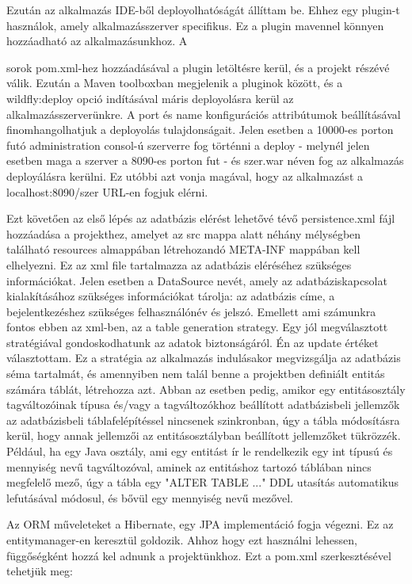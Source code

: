 \documentclass[centeredchapter]{thesis-ekf}
\theoremstyle{definition}
\theoremstyle{remark}
\begin{document}
Ezután az alkalmazás IDE-ből deployolhatóságát állíttam be. Ehhez egy plugin-t használok, amely alkalmazásszerver specifikus. Ez a plugin mavennel könnyen hozzáadható az alkalmazásunkhoz. A 	

sorok pom.xml-hez hozzáadásával a plugin letöltésre kerül, és a projekt részévé válik. Ezután a Maven toolboxban megjelenik a pluginok között, és a wildfly:deploy opció indításával máris deployolásra kerül az alkalmazásszerverünkre. A port és name konfigurációs attribútumok beállításával finomhangolhatjuk a deployolás tulajdonságait. Jelen esetben a 10000-es porton futó administration consol-ú szerverre fog történni a deploy - melynél jelen esetben maga a szerver a 8090-es porton fut - és szer.war néven fog az alkalmazás deployálásra kerülni. Ez utóbbi azt vonja magával, hogy az alkalmazást a localhost:8090/szer URL-en fogjuk elérni. 

Ezt követően az első lépés az adatbázis elérést lehetővé tévő persistence.xml fájl hozzáadása a projekthez, amelyet az src mappa alatt néhány mélységben található resources almappában létrehozandó META-INF mappában kell elhelyezni. Ez az xml file tartalmazza az adatbázis eléréséhez szükséges információkat. Jelen esetben a DataSource nevét, amely az adatbáziskapcsolat kialakításához szükséges információkat tárolja: az adatbázis címe, a bejelentkezéshez szükséges felhasználónév és jelszó.
Emellett ami számunkra fontos ebben az xml-ben, az a table generation strategy. Egy jól megválasztott stratégiával gondoskodhatunk az adatok biztonságáról. Én az update értéket választottam. Ez a stratégia az alkalmazás indulásakor megvizsgálja az adatbázis séma tartalmát, és amennyiben nem talál benne a projektben definiált entitás számára táblát, létrehozza azt. Abban az esetben pedig, amikor egy entitásosztály tagváltozóinak típusa és/vagy a tagváltozókhoz beállított adatbázisbeli jellemzők az adatbázisbeli táblafelépítéssel nincsenek szinkronban, úgy a tábla módosításra kerül, hogy annak jellemzői az entitásosztályban beállított jellemzőket tükrözzék.
Például, ha egy Java osztály, ami egy entitást ír le rendelkezik egy int típusú és mennyiség nevű tagváltozóval, aminek az entitáshoz tartozó táblában nincs megfelelő mező, úgy a tábla egy "ALTER TABLE ..." DDL utasítás automatikus lefutásával módosul, és bővül egy mennyiség nevű mezővel. 

Az ORM műveleteket a Hibernate, egy JPA implementáció fogja végezni. Ez az entitymanager-en keresztül goldozik. Ahhoz hogy ezt használni lehessen, függőségként hozzá kel adnunk a projektünkhoz. Ezt a pom.xml szerkesztésével tehetjük meg:
\end{document}
